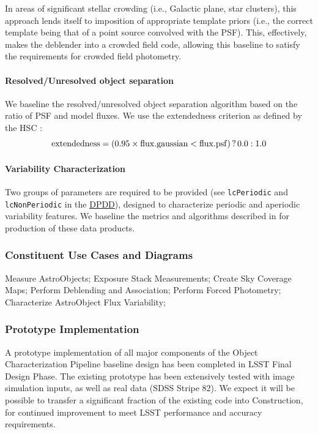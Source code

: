 \documentclass[12pt]{article}
\newcommand{\ds}[2]{{\color{blue} \href{https://docushare.lsstcorp.org/docushare/dsweb/Get/#1}{#2}}\xspace}
\newcommand{\DPDD}{\ds{LSE-163}{DPDD}}
\begin{document}
In areas of significant stellar crowding (i.e., Galactic plane, star clusters), this approach lends itself to imposition of appropriate template priors (i.e., the correct template being that of a point source convolved with the PSF). This, effectively, makes the deblender into a crowded field code, allowing this baseline to satisfy the requirements for crowded field photometry.

\paragraph{Resolved/Unresolved object separation}
\label{alg:star-galaxy}

We baseline the resolved/unresolved object separation algorithm based on the ratio of PSF and model fluxes. We use the extendedness criterion as defined by the HSC \cite{Furusawa14}:
\begin{equation}
{\rm extendedness} = (0.95\times {\rm flux.gaussian} < {\rm flux.psf})\, ?\, 0.0 : 1.0 \nonumber
\end{equation}

\paragraph{Variability Characterization}

       Two groups of parameters are required to be provided (see {\tt lcPeriodic} and {\tt lcNonPeriodic} in the \DPDD), designed to characterize periodic and aperiodic variability features. We baseline the metrics and algorithms described in \cite{Richards11} for production of these data products.

\subsubsection{Constituent Use Cases and Diagrams}

Measure AstroObjects; Exposure Stack Measurements;
Create Sky Coverage Maps; Perform Deblending and Association; Perform Forced Photometry; Characterize AstroObject Flux Variability;

\subsubsection{Prototype Implementation}

A prototype implementation of all major components of the Object Characterization Pipeline baseline design has been completed in LSST Final Design Phase. The existing prototype has been extensively tested with image simulation inputs, as well as real data (SDSS Stripe 82). We expect it will be possible to transfer a significant fraction of the existing code into Construction, for continued improvement to meet LSST performance and accuracy requirements.
\\
\end{document}
